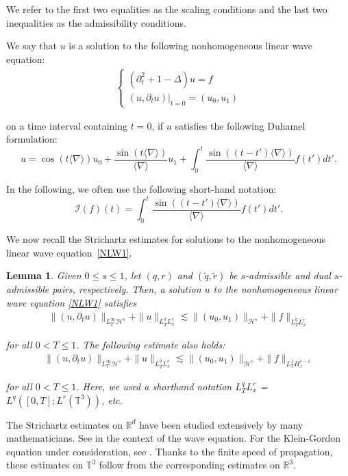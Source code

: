 \documentclass[%
11pt,  reqno]{amsart}
\newtheorem{lemma}[theorem]{Lemma}
\newcommand{\1}{\hspace{0.2mm}\text{I}\hspace{0.2mm}}
\newcommand{\noi}{\noindent}
\newcommand{\R}{\mathbb{R}}
\newcommand{\T}{\mathbb{T}}
\newcommand{\nb}{\nabla}
\newcommand{\Dl}{\Delta}
\newcommand{\wt}{\widetilde}
\newcommand{\dt}{\partial_t}
\newcommand{\jb}[1]
{\langle #1 \rangle}
\renewcommand{\H}{\mathcal{H}}
\newcommand{\I}{\mathcal{I}}
\numberwithin{equation}{section}
\numberwithin{theorem}{section}
\begin{document}
\noi
We refer to the first two equalities as the scaling conditions
and the last two inequalities as the admissibility conditions.



We say that  $u$ is a solution to the following nonhomogeneous linear wave equation:
\begin{align}
\begin{cases}
(\dt^2 + 1-\Dl) u = f \\
( u, \dt u) |_{t = 0}=(u_0,  u_1) 
\end{cases}
\label{NLW1}
\end{align}


\noi
on a time interval containing $t= 0$, 
if $u$ satisfies the following Duhamel formulation:
\[ u =  \cos (t\jb{\nb}) u_0 +   \frac{\sin (t\jb{\nb})}{ \jb{\nb}} u_1 
+ \int_0^t  \frac{\sin ((t-t')\jb{\nb})}{ \jb{\nb}}   f(t') dt'. \]  

\noi
In the following, we often use
the following short-hand notation:
\[ \I(f)(t) =  \int_0^t  \frac{\sin ((t-t')\jb{\nb})}{ \jb{\nb}}   f(t') dt'. \]   


\noi
We now recall the  Strichartz estimates
for solutions to the nonhomogeneous linear wave equation~\eqref{NLW1}.



\begin{lemma}\label{LEM:Str}
Given $0 \leq s \leq 1$,
let $(q, r)$ and $(\wt q,\wt r)$
be $s$-admissible and dual $s$-admissible pairs, respectively. 
Then, a solution $u$ to the nonhomogeneous linear wave equation \eqref{NLW1}
satisfies
\begin{align*}
\| (u, \dt u) \|_ {L^\infty_T \H^s } + 
 \| u  \|_{L^q_TL^r_x}
\lesssim 
\|(u_0, u_1) \|_{\H^s}  +  \| f \|_{L^{\wt q}_TL^{\wt r}_x}
\end{align*}

\noi
for all $0 < T \leq 1$. 
The following estimate also holds:
\begin{align*}
\| (u, \dt u) \|_ {L^\infty_T \H^s } 
+  \| u  \|_{L^q_TL^r_x}
\lesssim 
\|(u_0, u_1) \|_{\H^s}  +  \| f \|_{L^{1}_T H^{s-1}_x}
\end{align*}

\noi
for all $0 < T \leq 1$.
Here, we used a shorthand notation
$L^q_TL^r_x$ = $L^q([0, T]; L^r(\T^3))$, etc.
\end{lemma}


The Strichartz estimates on $\R^d$ have been studied extensively by many
mathematicians.  See \cite{GV, LS, KeelTao}
in the context of the wave equation.
For the Klein-Gordon equation under consideration, 
see \cite{KSV}.
Thanks to the finite speed of propagation, 
these estimates on $\T^3$ follow from the corresponding
estimates on $\R^3$.
\end{document}
